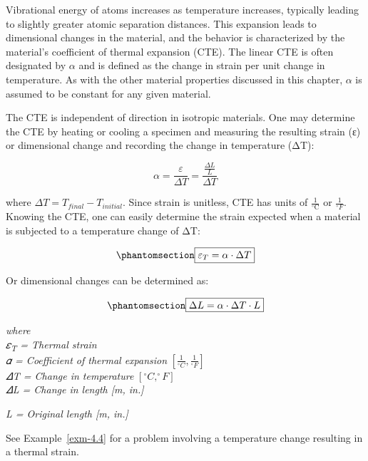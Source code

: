 \documentclass[
  letterpaper,
  DIV=11,
  numbers=noendperiod]{scrreprt}
\theoremstyle{definition}
\theoremstyle{remark}
\begin{document}
Vibrational energy of atoms increases as temperature increases,
typically leading to slightly greater atomic separation distances. This
expansion leads to dimensional changes in the material, and the behavior
is characterized by the material's coefficient of thermal expansion
(CTE). The linear CTE is often designated by \(\alpha\) and is defined
as the change in strain per unit change in temperature. As with the
other material properties discussed in this chapter, \(\alpha\) is
assumed to be constant for any given material.

The CTE is independent of direction in isotropic materials. One may
determine the CTE by heating or cooling a specimen and measuring the
resulting strain (ε) or dimensional change and recording the change in
temperature (ΔT):

\[
\alpha=\frac{\varepsilon}{\Delta T}=\frac{\frac{\Delta L}{L}}{\Delta T}
\]

where \(\Delta T=T_{final}-T_{initial}\). Since strain is unitless, CTE
has units of \(\frac{1}{{ }^{\circ} \mathrm{C}}\) or
\(\frac{1}{{ }^{\circ} F}\). Knowing the CTE, one can easily determine
the strain expected when a material is subjected to a temperature change
of ΔT:

\begin{equation}\phantomsection\label{eq-4.5}{
\boxed{\varepsilon_T=\alpha \cdot \Delta T}
}\end{equation}

Or dimensional changes can be determined as:

\begin{equation}\phantomsection\label{eq-4.6}{
\boxed{\Delta L=\alpha \cdot \Delta T \cdot L}
}\end{equation}

\emph{where}\\
\emph{𝜀\textsubscript{T} = Thermal strain}\\
\emph{𝛼 = Coefficient of thermal expansion}
\(\left[\frac{1}{^\circ C},\frac{1}{^\circ F}\right]\)\\
\emph{𝛥T = Change in temperature} \([^\circ C, ^\circ F]\)\\
\emph{𝛥L = Change in length {[}m, in.{]}}

\emph{L = Original length {[}m, in.{]}}

See Example~\ref{exm-4.4} for a problem involving a temperature change
resulting in a thermal strain.
\end{document}
